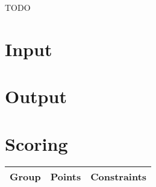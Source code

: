 TODO

\section*{Input}

\section*{Output}

\section*{Scoring}
\begin{tabular}{|l|l|l|}
    \hline
    Group & Points & Constraints \\ \hline
\end{tabular}

